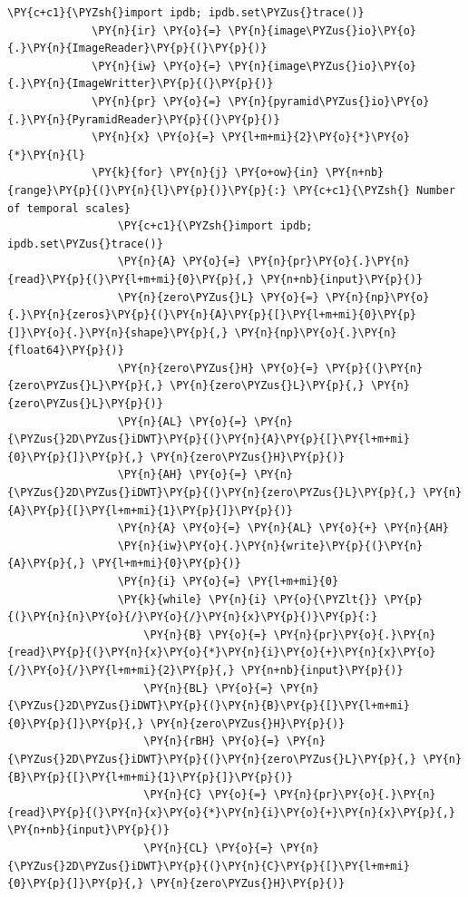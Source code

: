 {\begin{Verbatim}[commandchars=\\\{\}]
             \PY{c+c1}{\PYZsh{}import ipdb; ipdb.set\PYZus{}trace()}
             \PY{n}{ir} \PY{o}{=} \PY{n}{image\PYZus{}io}\PY{o}{.}\PY{n}{ImageReader}\PY{p}{(}\PY{p}{)}
             \PY{n}{iw} \PY{o}{=} \PY{n}{image\PYZus{}io}\PY{o}{.}\PY{n}{ImageWritter}\PY{p}{(}\PY{p}{)}
             \PY{n}{pr} \PY{o}{=} \PY{n}{pyramid\PYZus{}io}\PY{o}{.}\PY{n}{PyramidReader}\PY{p}{(}\PY{p}{)}
             \PY{n}{x} \PY{o}{=} \PY{l+m+mi}{2}\PY{o}{*}\PY{o}{*}\PY{n}{l}
             \PY{k}{for} \PY{n}{j} \PY{o+ow}{in} \PY{n+nb}{range}\PY{p}{(}\PY{n}{l}\PY{p}{)}\PY{p}{:} \PY{c+c1}{\PYZsh{} Number of temporal scales}
                 \PY{c+c1}{\PYZsh{}import ipdb; ipdb.set\PYZus{}trace()}
                 \PY{n}{A} \PY{o}{=} \PY{n}{pr}\PY{o}{.}\PY{n}{read}\PY{p}{(}\PY{l+m+mi}{0}\PY{p}{,} \PY{n+nb}{input}\PY{p}{)}
                 \PY{n}{zero\PYZus{}L} \PY{o}{=} \PY{n}{np}\PY{o}{.}\PY{n}{zeros}\PY{p}{(}\PY{n}{A}\PY{p}{[}\PY{l+m+mi}{0}\PY{p}{]}\PY{o}{.}\PY{n}{shape}\PY{p}{,} \PY{n}{np}\PY{o}{.}\PY{n}{float64}\PY{p}{)}
                 \PY{n}{zero\PYZus{}H} \PY{o}{=} \PY{p}{(}\PY{n}{zero\PYZus{}L}\PY{p}{,} \PY{n}{zero\PYZus{}L}\PY{p}{,} \PY{n}{zero\PYZus{}L}\PY{p}{)}
                 \PY{n}{AL} \PY{o}{=} \PY{n}{\PYZus{}2D\PYZus{}iDWT}\PY{p}{(}\PY{n}{A}\PY{p}{[}\PY{l+m+mi}{0}\PY{p}{]}\PY{p}{,} \PY{n}{zero\PYZus{}H}\PY{p}{)}
                 \PY{n}{AH} \PY{o}{=} \PY{n}{\PYZus{}2D\PYZus{}iDWT}\PY{p}{(}\PY{n}{zero\PYZus{}L}\PY{p}{,} \PY{n}{A}\PY{p}{[}\PY{l+m+mi}{1}\PY{p}{]}\PY{p}{)}
                 \PY{n}{A} \PY{o}{=} \PY{n}{AL} \PY{o}{+} \PY{n}{AH}
                 \PY{n}{iw}\PY{o}{.}\PY{n}{write}\PY{p}{(}\PY{n}{A}\PY{p}{,} \PY{l+m+mi}{0}\PY{p}{)}
                 \PY{n}{i} \PY{o}{=} \PY{l+m+mi}{0}
                 \PY{k}{while} \PY{n}{i} \PY{o}{\PYZlt{}} \PY{p}{(}\PY{n}{n}\PY{o}{/}\PY{o}{/}\PY{n}{x}\PY{p}{)}\PY{p}{:}
                     \PY{n}{B} \PY{o}{=} \PY{n}{pr}\PY{o}{.}\PY{n}{read}\PY{p}{(}\PY{n}{x}\PY{o}{*}\PY{n}{i}\PY{o}{+}\PY{n}{x}\PY{o}{/}\PY{o}{/}\PY{l+m+mi}{2}\PY{p}{,} \PY{n+nb}{input}\PY{p}{)}
                     \PY{n}{BL} \PY{o}{=} \PY{n}{\PYZus{}2D\PYZus{}iDWT}\PY{p}{(}\PY{n}{B}\PY{p}{[}\PY{l+m+mi}{0}\PY{p}{]}\PY{p}{,} \PY{n}{zero\PYZus{}H}\PY{p}{)}
                     \PY{n}{rBH} \PY{o}{=} \PY{n}{\PYZus{}2D\PYZus{}iDWT}\PY{p}{(}\PY{n}{zero\PYZus{}L}\PY{p}{,} \PY{n}{B}\PY{p}{[}\PY{l+m+mi}{1}\PY{p}{]}\PY{p}{)}
                     \PY{n}{C} \PY{o}{=} \PY{n}{pr}\PY{o}{.}\PY{n}{read}\PY{p}{(}\PY{n}{x}\PY{o}{*}\PY{n}{i}\PY{o}{+}\PY{n}{x}\PY{p}{,} \PY{n+nb}{input}\PY{p}{)}
                     \PY{n}{CL} \PY{o}{=} \PY{n}{\PYZus{}2D\PYZus{}iDWT}\PY{p}{(}\PY{n}{C}\PY{p}{[}\PY{l+m+mi}{0}\PY{p}{]}\PY{p}{,} \PY{n}{zero\PYZus{}H}\PY{p}{)}

\end{Verbatim}}

